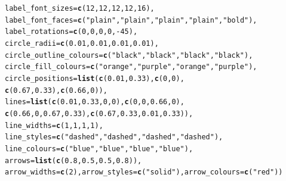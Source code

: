 \documentclass{article}\usepackage[]{graphicx}\usepackage[]{color}
\makeatletter
\newcommand{\hlnum}[1]{\textcolor[rgb]{0.686,0.059,0.569}{#1}}%
\newcommand{\hlstr}[1]{\textcolor[rgb]{0.192,0.494,0.8}{#1}}%
\newcommand{\hlopt}[1]{\textcolor[rgb]{0,0,0}{#1}}%
\newcommand{\hlstd}[1]{\textcolor[rgb]{0.345,0.345,0.345}{#1}}%
\newcommand{\hlkwc}[1]{\textcolor[rgb]{0.333,0.667,0.333}{#1}}%
\newcommand{\hlkwd}[1]{\textcolor[rgb]{0.737,0.353,0.396}{\textbf{#1}}}%
\newenvironment{kframe}{%
 \def\at@end@of@kframe{}%
 \ifinner\ifhmode%
  \def\at@end@of@kframe{\end{minipage}}%
  \begin{minipage}{\columnwidth}%
 \fi\fi%
 \def\FrameCommand##1{\hskip\@totalleftmargin \hskip-\fboxsep
 \colorbox{shadecolor}{##1}\hskip-\fboxsep
     \hskip-\linewidth \hskip-\@totalleftmargin \hskip\columnwidth}%
 \MakeFramed {\advance\hsize-\width
   \@totalleftmargin\z@ \linewidth\hsize
   \@setminipage}}%
 {\par\unskip\endMakeFramed%
 \at@end@of@kframe}
\newenvironment{knitrout}{}{} %
\makeatother
\begin{document}
\begin{knitrout}
\begin{kframe}
\begin{alltt}
        \hlkwc{label_font_sizes}\hlstd{=}\hlkwd{c}\hlstd{(}\hlnum{12}\hlstd{,}\hlnum{12}\hlstd{,}\hlnum{12}\hlstd{,}\hlnum{12}\hlstd{,}\hlnum{16}\hlstd{),}
        \hlkwc{label_font_faces}\hlstd{=}\hlkwd{c}\hlstd{(}\hlstr{"plain"}\hlstd{,}\hlstr{"plain"}\hlstd{,}\hlstr{"plain"}\hlstd{,}\hlstr{"plain"}\hlstd{,}\hlstr{"bold"}\hlstd{),}
        \hlkwc{label_rotations}\hlstd{=}\hlkwd{c}\hlstd{(}\hlnum{0}\hlstd{,}\hlnum{0}\hlstd{,}\hlnum{0}\hlstd{,}\hlnum{0}\hlstd{,}\hlopt{-}\hlnum{45}\hlstd{),}
        \hlkwc{circle_radii}\hlstd{=}\hlkwd{c}\hlstd{(}\hlnum{0.01}\hlstd{,}\hlnum{0.01}\hlstd{,}\hlnum{0.01}\hlstd{,}\hlnum{0.01}\hlstd{),}
        \hlkwc{circle_outline_colours}\hlstd{=}\hlkwd{c}\hlstd{(}\hlstr{"black"}\hlstd{,}\hlstr{"black"}\hlstd{,}\hlstr{"black"}\hlstd{,}\hlstr{"black"}\hlstd{),}
        \hlkwc{circle_fill_colours}\hlstd{=}\hlkwd{c}\hlstd{(}\hlstr{"orange"}\hlstd{,}\hlstr{"purple"}\hlstd{,}\hlstr{"orange"}\hlstd{,}\hlstr{"purple"}\hlstd{),}
        \hlkwc{circle_positions}\hlstd{=}\hlkwd{list}\hlstd{(}\hlkwd{c}\hlstd{(}\hlnum{0.01}\hlstd{,}\hlnum{0.33}\hlstd{),}\hlkwd{c}\hlstd{(}\hlnum{0}\hlstd{,}\hlnum{0}\hlstd{),}
                \hlkwd{c}\hlstd{(}\hlnum{0.67}\hlstd{,}\hlnum{0.33}\hlstd{),}\hlkwd{c}\hlstd{(}\hlnum{0.66}\hlstd{,}\hlnum{0}\hlstd{)),}
        \hlkwc{lines}\hlstd{=}\hlkwd{list}\hlstd{(}\hlkwd{c}\hlstd{(}\hlnum{0.01}\hlstd{,}\hlnum{0.33}\hlstd{,}\hlnum{0}\hlstd{,}\hlnum{0}\hlstd{),}\hlkwd{c}\hlstd{(}\hlnum{0}\hlstd{,}\hlnum{0}\hlstd{,}\hlnum{0.66}\hlstd{,}\hlnum{0}\hlstd{),}
                \hlkwd{c}\hlstd{(}\hlnum{0.66}\hlstd{,}\hlnum{0}\hlstd{,}\hlnum{0.67}\hlstd{,}\hlnum{0.33}\hlstd{),}\hlkwd{c}\hlstd{(}\hlnum{0.67}\hlstd{,}\hlnum{0.33}\hlstd{,}\hlnum{0.01}\hlstd{,}\hlnum{0.33}\hlstd{)),}
        \hlkwc{line_widths}\hlstd{=}\hlkwd{c}\hlstd{(}\hlnum{1}\hlstd{,} \hlnum{1}\hlstd{,} \hlnum{1}\hlstd{,} \hlnum{1}\hlstd{),}
        \hlkwc{line_styles}\hlstd{=}\hlkwd{c}\hlstd{(}\hlstr{"dashed"}\hlstd{,} \hlstr{"dashed"}\hlstd{,} \hlstr{"dashed"}\hlstd{,} \hlstr{"dashed"}\hlstd{),}
        \hlkwc{line_colours}\hlstd{=}\hlkwd{c}\hlstd{(}\hlstr{"blue"}\hlstd{,}\hlstr{"blue"}\hlstd{,}\hlstr{"blue"}\hlstd{,}\hlstr{"blue"}\hlstd{),}
        \hlkwc{arrows}\hlstd{=}\hlkwd{list}\hlstd{(}\hlkwd{c}\hlstd{(}\hlnum{0.8}\hlstd{,}\hlnum{0.5}\hlstd{,}\hlnum{0.5}\hlstd{,}\hlnum{0.8}\hlstd{)),}
        \hlkwc{arrow_widths}\hlstd{=}\hlkwd{c}\hlstd{(}\hlnum{2}\hlstd{),} \hlkwc{arrow_styles}\hlstd{=}\hlkwd{c}\hlstd{(}\hlstr{"solid"}\hlstd{),} \hlkwc{arrow_colours}\hlstd{=}\hlkwd{c}\hlstd{(}\hlstr{"red"}\hlstd{))}
\end{alltt}
\end{kframe}


\end{knitrout}
\end{document}
